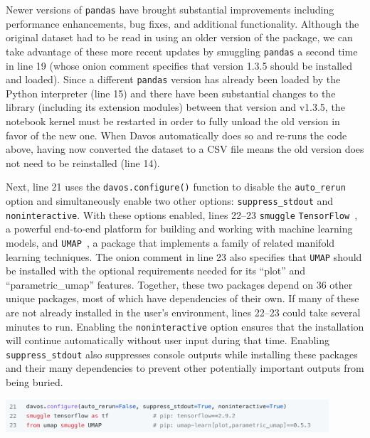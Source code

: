 \documentclass[preprint,12pt,a4paper]{elsarticle}
\begin{document}
Newer versions of \texttt{pandas} have brought substantial improvements
including performance enhancements, bug fixes, and additional functionality. Although
the original dataset had to be read in using an older version of the package,
we can take advantage of these more recent updates by smuggling \texttt{pandas}
a second time in line 19 (whose onion comment specifies that version 1.3.5
should be installed and loaded). Since a different \texttt{pandas} version
has already been loaded by the Python interpreter (line 15) and there have been
substantial changes to the library (including its extension modules)
between that version and v1.3.5, the notebook
kernel must be restarted in order to fully unload the old version in favor of
the new one. 
When Davos automatically does so and re-runs the code above, having now converted the dataset to a CSV file means the old version does not need to be reinstalled (line 14). 

Next, line 21 uses the \texttt{davos.configure()} function to disable
the \texttt{auto\_rerun} option and simultaneously enable two other
options: \texttt{suppress\_stdout} and \texttt{noninteractive}. With
these options enabled, lines 22--23 \texttt{smuggle}
\texttt{TensorFlow}~\cite{AbadEtal15}, a powerful end-to-end platform
for building and working with machine learning models, and
\texttt{UMAP}~\cite{McInEtal18}, a package that implements a family
of related manifold learning techniques. The onion comment in line 23
also specifies that \texttt{UMAP} should be installed with the
optional requirements needed for its ``plot'' and ``parametric\_umap''
features. Together, these two packages depend on 36 other unique
packages, most of which have dependencies of their own. If many of
these are not already installed in the user's environment, lines
22--23 could take several minutes to run.  Enabling the
\texttt{noninteractive} option ensures that the installation will
continue automatically without user input during that time.  Enabling
\texttt{suppress\_stdout} also suppresses console outputs while installing
these packages and their many dependencies to prevent other potentially important outputs from being buried.
\begin{center}
\includegraphics[width=0.9\textwidth]{figs/example5}
\end{center}
\end{document}
